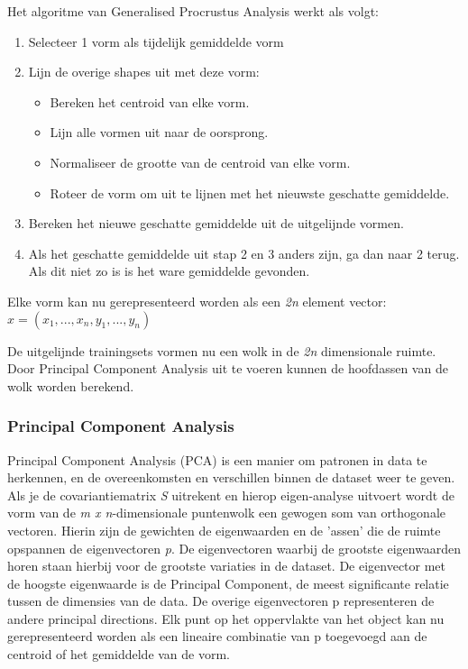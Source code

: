 Het algoritme van Generalised Procrustus Analysis werkt als volgt\cite{gpa}:
\begin{enumerate}
	\item Selecteer 1 vorm als tijdelijk gemiddelde vorm
	\item Lijn de overige shapes uit met deze vorm:
	\begin{itemize}
		\item Bereken het centroid van elke vorm.
		\item Lijn alle vormen uit naar de oorsprong.
		\item Normaliseer de grootte van de centroid van elke vorm.
		\item Roteer de vorm om uit te lijnen met het nieuwste geschatte gemiddelde.
	\end{itemize}
	\item Bereken het nieuwe geschatte gemiddelde uit de uitgelijnde vormen.
	\item Als het geschatte gemiddelde uit stap 2 en 3 anders zijn, ga dan naar 2 terug. Als dit niet zo is is het ware gemiddelde gevonden.
\end{enumerate}

Elke vorm kan nu gerepresenteerd worden als een \textit{2n} element vector:\
$x = (x_{1},...,x_{n},y_{1},...,y_{n})$ 

De uitgelijnde trainingsets vormen nu een wolk in de \textit{2n} dimensionale ruimte. Door Principal Component Analysis uit te voeren kunnen de hoofdassen van de wolk worden berekend.

\subsubsection{Principal Component Analysis}

Principal Component Analysis (PCA) is een manier om patronen in data te herkennen, en de overeenkomsten en verschillen binnen de dataset weer te geven.\cite{pca}
Als je de covariantiematrix \textit{S} uitrekent en hierop eigen-analyse uitvoert wordt de vorm van de \textit{m x n}-dimensionale puntenwolk een gewogen som van orthogonale vectoren. Hierin zijn de gewichten de eigenwaarden \lambda en de 'assen' die de ruimte opspannen de eigenvectoren \textit{p}. 
De eigenvectoren waarbij de grootste eigenwaarden horen staan hierbij voor de grootste variaties in de dataset. 
De eigenvector met de hoogste eigenwaarde is de Principal Component, de meest significante relatie tussen de dimensies van de data. 
De overige eigenvectoren p representeren de andere principal directions. Elk punt op het oppervlakte van het object kan nu gerepresenteerd worden als een lineaire combinatie van p toegevoegd aan de centroid of het gemiddelde van de vorm.

